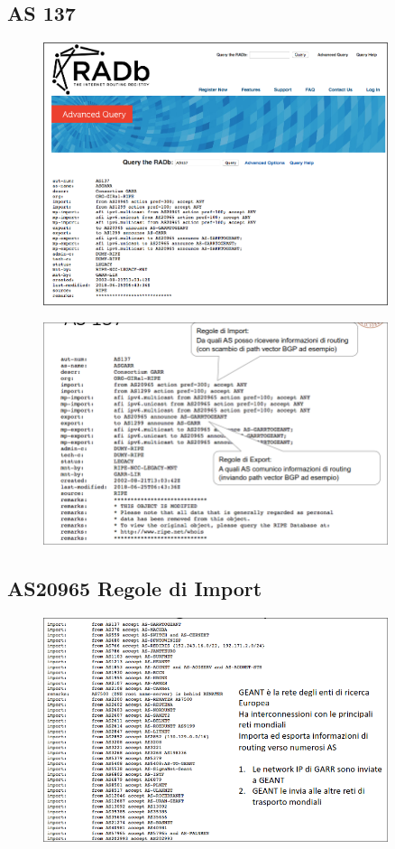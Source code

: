 \documentclass{report}
\begin{document}
            \subsection{AS 137}
                \begin{figure}[H]
                    \includegraphics[width=0.9\textwidth]{3/AS1.png}
                \end{figure}
                \begin{figure}[H]
                    \includegraphics[width=0.9\textwidth]{3/AS2.png}
                \end{figure}
            \subsection{AS20965 Regole di Import}
                \begin{figure}[H]
                    \includegraphics[width=0.9\textwidth]{3/AS3.png}
                \end{figure}
\end{document}
